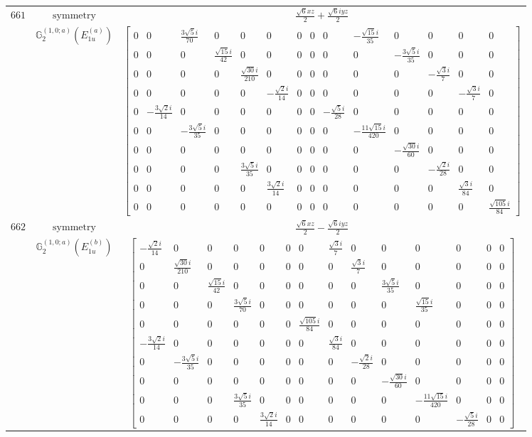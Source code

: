 \documentclass[fleqn,8pt,landscape]{jsarticle}
\begin{document}
\begin{longtable}{ccc}
$ 661 $ & $ \text{symmetry} $ & $ \frac{\sqrt{6} x z}{2} + \frac{\sqrt{6} i y z}{2} $ \\
$  $ & $ \mathbb{G}_{2}^{(1,0;a)}(E_{1u}^{(a)}) $ & $ \begin{bmatrix} 0 & 0 & \frac{3 \sqrt{5} i}{70} & 0 & 0 & 0 & 0 & 0 & 0 & - \frac{\sqrt{15} i}{35} & 0 & 0 & 0 & 0 \\ 0 & 0 & 0 & \frac{\sqrt{15} i}{42} & 0 & 0 & 0 & 0 & 0 & 0 & - \frac{3 \sqrt{5} i}{35} & 0 & 0 & 0 \\ 0 & 0 & 0 & 0 & \frac{\sqrt{30} i}{210} & 0 & 0 & 0 & 0 & 0 & 0 & - \frac{\sqrt{3} i}{7} & 0 & 0 \\ 0 & 0 & 0 & 0 & 0 & - \frac{\sqrt{2} i}{14} & 0 & 0 & 0 & 0 & 0 & 0 & - \frac{\sqrt{3} i}{7} & 0 \\ 0 & - \frac{3 \sqrt{2} i}{14} & 0 & 0 & 0 & 0 & 0 & 0 & - \frac{\sqrt{5} i}{28} & 0 & 0 & 0 & 0 & 0 \\ 0 & 0 & - \frac{3 \sqrt{5} i}{35} & 0 & 0 & 0 & 0 & 0 & 0 & - \frac{11 \sqrt{15} i}{420} & 0 & 0 & 0 & 0 \\ 0 & 0 & 0 & 0 & 0 & 0 & 0 & 0 & 0 & 0 & - \frac{\sqrt{30} i}{60} & 0 & 0 & 0 \\ 0 & 0 & 0 & 0 & \frac{3 \sqrt{5} i}{35} & 0 & 0 & 0 & 0 & 0 & 0 & - \frac{\sqrt{2} i}{28} & 0 & 0 \\ 0 & 0 & 0 & 0 & 0 & \frac{3 \sqrt{2} i}{14} & 0 & 0 & 0 & 0 & 0 & 0 & \frac{\sqrt{3} i}{84} & 0 \\ 0 & 0 & 0 & 0 & 0 & 0 & 0 & 0 & 0 & 0 & 0 & 0 & 0 & \frac{\sqrt{105} i}{84} \end{bmatrix} $ \\ \hline
$ 662 $ & $ \text{symmetry} $ & $ \frac{\sqrt{6} x z}{2} - \frac{\sqrt{6} i y z}{2} $ \\
$  $ & $ \mathbb{G}_{2}^{(1,0;a)}(E_{1u}^{(b)}) $ & $ \begin{bmatrix} - \frac{\sqrt{2} i}{14} & 0 & 0 & 0 & 0 & 0 & 0 & \frac{\sqrt{3} i}{7} & 0 & 0 & 0 & 0 & 0 & 0 \\ 0 & \frac{\sqrt{30} i}{210} & 0 & 0 & 0 & 0 & 0 & 0 & \frac{\sqrt{3} i}{7} & 0 & 0 & 0 & 0 & 0 \\ 0 & 0 & \frac{\sqrt{15} i}{42} & 0 & 0 & 0 & 0 & 0 & 0 & \frac{3 \sqrt{5} i}{35} & 0 & 0 & 0 & 0 \\ 0 & 0 & 0 & \frac{3 \sqrt{5} i}{70} & 0 & 0 & 0 & 0 & 0 & 0 & \frac{\sqrt{15} i}{35} & 0 & 0 & 0 \\ 0 & 0 & 0 & 0 & 0 & 0 & \frac{\sqrt{105} i}{84} & 0 & 0 & 0 & 0 & 0 & 0 & 0 \\ - \frac{3 \sqrt{2} i}{14} & 0 & 0 & 0 & 0 & 0 & 0 & \frac{\sqrt{3} i}{84} & 0 & 0 & 0 & 0 & 0 & 0 \\ 0 & - \frac{3 \sqrt{5} i}{35} & 0 & 0 & 0 & 0 & 0 & 0 & - \frac{\sqrt{2} i}{28} & 0 & 0 & 0 & 0 & 0 \\ 0 & 0 & 0 & 0 & 0 & 0 & 0 & 0 & 0 & - \frac{\sqrt{30} i}{60} & 0 & 0 & 0 & 0 \\ 0 & 0 & 0 & \frac{3 \sqrt{5} i}{35} & 0 & 0 & 0 & 0 & 0 & 0 & - \frac{11 \sqrt{15} i}{420} & 0 & 0 & 0 \\ 0 & 0 & 0 & 0 & \frac{3 \sqrt{2} i}{14} & 0 & 0 & 0 & 0 & 0 & 0 & - \frac{\sqrt{5} i}{28} & 0 & 0 \end{bmatrix} $ \\ \hline

\end{longtable}
\end{document}
